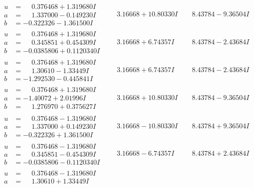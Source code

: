\documentclass[1p]{elsarticle_modified}
\theoremstyle{definition}
\begin{document}
$$\begin{array}{c|c|c}
\begin{aligned}
u &= \phantom{-}0.376468 + 1.319680 I \\
a &= \phantom{-}1.337000 - 0.149230 I \\
b &= -0.322326 - 1.361500 I\end{aligned}
 & \phantom{-}3.16668 + 10.80330 I & \phantom{-}8.43784 - 9.36504 I \\ \hline\begin{aligned}
u &= \phantom{-}0.376468 + 1.319680 I \\
a &= \phantom{-}0.345851 + 0.454309 I \\
b &= -0.0385806 + 0.1120340 I\end{aligned}
 & \phantom{-}3.16668 + 6.74357 I & \phantom{-}8.43784 - 2.43684 I \\ \hline\begin{aligned}
u &= \phantom{-}0.376468 + 1.319680 I \\
a &= \phantom{-}1.30610 - 1.33449 I \\
b &= -1.292530 - 0.445841 I\end{aligned}
 & \phantom{-}3.16668 + 6.74357 I & \phantom{-}8.43784 - 2.43684 I \\ \hline\begin{aligned}
u &= \phantom{-}0.376468 + 1.319680 I \\
a &= -1.40072 + 2.01996 I \\
b &= \phantom{-}1.276970 + 0.375627 I\end{aligned}
 & \phantom{-}3.16668 + 10.80330 I & \phantom{-}8.43784 - 9.36504 I \\ \hline\begin{aligned}
u &= \phantom{-}0.376468 - 1.319680 I \\
a &= \phantom{-}1.337000 + 0.149230 I \\
b &= -0.322326 + 1.361500 I\end{aligned}
 & \phantom{-}3.16668 - 10.80330 I & \phantom{-}8.43784 + 9.36504 I \\ \hline\begin{aligned}
u &= \phantom{-}0.376468 - 1.319680 I \\
a &= \phantom{-}0.345851 - 0.454309 I \\
b &= -0.0385806 - 0.1120340 I\end{aligned}
 & \phantom{-}3.16668 - 6.74357 I & \phantom{-}8.43784 + 2.43684 I \\ \hline\begin{aligned}
u &= \phantom{-}0.376468 - 1.319680 I \\
a &= \phantom{-}1.30610 + 1.33449 I \\

\end{aligned}
\end{array}$$
\end{document}
